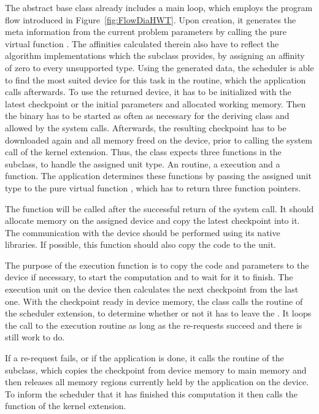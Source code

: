 The abstract base class already includes a main loop, which employs the program flow introduced in Figure~\ref{fig:FlowDiaHWT}. Upon creation, it generates the meta information from the current problem parameters by calling the pure virtual function . The affinities calculated therein also have to reflect the algorithm implementations which the subclass provides, by assigning an affinity of zero to every unsupported \cu{} type. Using the generated data, the scheduler is able to find the most suited device for this task in the  routine, which the application calls afterwards. To use the returned device, it has to be initialized with the latest checkpoint or the initial parameters and allocated working memory. Then the binary has to be started as often as necessary for the deriving class and allowed by the  system calls. Afterwards, the resulting checkpoint has to be downloaded again and all memory freed on the device, prior to calling the  system call of the kernel extension. Thus, the  class expects three functions in the subclass, to handle the assigned unit type. An  routine, a  execution and a  function. The application determines these functions by passing the assigned unit type to the pure virtual function , which has to return three function pointers.

The  function will be called after the successful return of the  system call. It should allocate memory on the assigned device and copy the latest checkpoint into it. The communication with the device should be performed using its native libraries. If possible, this function should also copy the code to the unit.

The purpose of the  execution function is to copy the code and parameters to the device if necessary, to start the computation and to wait for it to finish. The execution unit on the device then calculates the next checkpoint from the last one. With the checkpoint ready in device memory, the  class calls the  routine of the scheduler extension, to determine whether or not it has to leave the \cu{}. It loops the call to the  execution routine as long as the re-requests succeed and there is still work to do.

If a re-request fails, or if the application is done, it calls the  routine of the subclass, which copies the checkpoint from device memory to main memory and then releases all memory regions currently held by the application on the device. To inform the scheduler that it has finished this computation it then calls the  function of the kernel extension.

